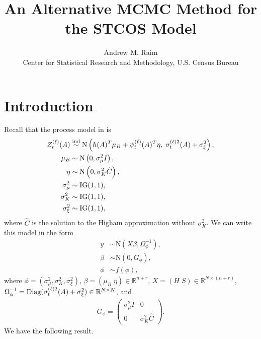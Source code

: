 \documentclass[10pt]{article}
\title{An Alternative MCMC Method for the STCOS Model}
\author{Andrew M. Raim
\vspace{0.5em} \\
Center for Statistical Research and Methodology, U.S. Census Bureau
}
\begin{document}
\maketitle

\section{Introduction}
\label{sec:intro}
Recall that the process model in \citet{BradleyEtAl2016-STAT} is
%
\begin{align*}
Z_t^{(\ell)}(A) &\stackrel{\text{ind}}{\sim} \text{N}\left(
h(A)^T \mu_B + \psi_t^{(\ell)}(A)^T \eta, \;
\sigma_t^{(\ell)2}(A) + \sigma_\xi^2
\right), \\
\mu_B &\sim \text{N}\left(0, \sigma_\mu^2 I \right), \\
\eta &\sim \text{N}\left(0, \sigma_K^2 \hat{C} \right), \\
\sigma_\mu^2 &\sim \text{IG}(1, 1), \\
\sigma_K^2 &\sim \text{IG}(1, 1), \\
\sigma_\xi^2 &\sim \text{IG}(1, 1),
\end{align*}
%
where $\hat{C}$ is the solution to the Higham approximation without $\sigma_K^2$. We can write this model in the form
%
\begin{align}
y &\sim \text{N}(X \beta, \Omega_\phi^{-1}), \nonumber \\
\beta &\sim \text{N}(0, G_\phi), \nonumber \\
\phi &\sim f(\phi),
\label{eqn:regression}
\end{align}
%
where $\phi = (\sigma_\mu^2, \sigma_K^2, \sigma_\xi^2)$, $\beta = (\mu_B \; \eta) \in \mathbb{R}^{n + r}$, $X = (H \; S) \in \mathbb{R}^{N \times (n + r)}$, $\Omega_\phi^{-1} = \operatorname{Diag}(\sigma_t^{(\ell)2}(A) + \sigma_\xi^2) \in \mathbb{R}^{N \times N}$, and
%
\begin{align*}
G_\phi =
\begin{pmatrix}
\sigma_\mu^2 I & 0 \\
0 & \sigma_K^2 \hat{C}
\end{pmatrix}.
\end{align*}
%
We have the following result.
\end{document}
